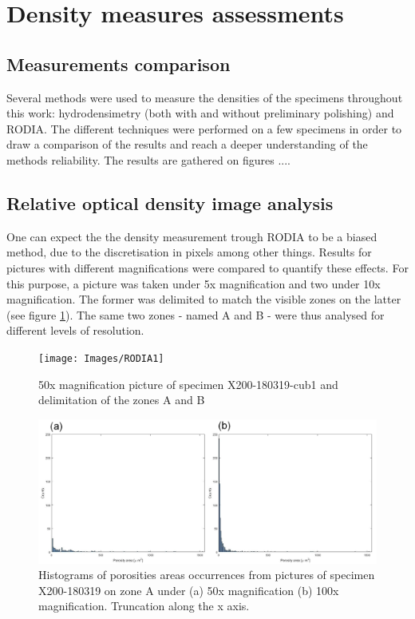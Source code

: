 \section{Density measures assessments}

\subsection{Measurements comparison}

Several methods were used to measure the densities of the specimens throughout this work: hydrodensimetry (both with and without preliminary polishing) and RODIA. The different techniques were performed on a few specimens in order to draw a comparison of the results and reach a deeper understanding of the methods reliability. The results are gathered on figures ....


\subsection{Relative optical density image analysis}
\label{RRODIA}
One can expect the the density measurement trough RODIA to be a biased method, due to the discretisation in pixels among other things. Results for pictures with different magnifications were compared to quantify these effects. For this purpose, a picture was taken under 5x magnification and two under 10x magnification. The former was delimited to match the visible zones on the latter (see figure \ref{fig:RODIA1}). The same two zones - named A and B - were thus analysed for different levels of resolution.\\

\begin{figure}[ht]
	\centering
	\centerline{\texttt{[image: Images/RODIA1]}}
	\decoRule
	\caption[50x magnification picture of specimen X200-180319-cub1 and delimitation of the zones A and B]{50x magnification picture of specimen X200-180319-cub1 and delimitation of the zones A and B}
	\label{fig:RODIA1}
\end{figure}

\begin{figure}[ht]
	\centering
	\centerline{\includegraphics[scale=0.43]{Images/RODIAHist}}
	\decoRule
	\caption[Histograms of porosities areas occurrences from pictures of specimen X200-180319 on zone A under (a) 50x magnification (b) 100x magnification]{Histograms of porosities areas occurrences from pictures of specimen X200-180319 on zone A under (a) 50x magnification (b) 100x magnification. Truncation along the x axis. }
	\label{fig:RODIAH}
\end{figure}


